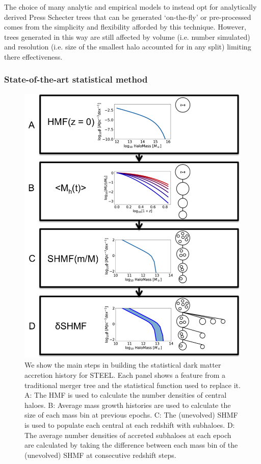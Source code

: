 The choice of many analytic and empirical models to instead opt for analytically derived Press Schecter trees that can be generated `on-the-fly' or pre-processed comes from the simplicity and flexibility afforded by this technique. However, trees generated in this way are still affected by volume (i.e. number simulated) and resolution (i.e. size of the smallest halo accounted for in any split) limiting there effectiveness.

\subsubsection{State-of-the-art statistical method}
\begin{figure}[h!]
    \centering
    \includegraphics[width = \linewidth]{Figures/Chapter2/StatDM.png}
    \caption{We show the main steps in building the statistical dark matter accretion history for STEEL. Each panel shows a feature from a traditional merger tree and the statistical function used to replace it. A: The HMF is used to calculate the number densities of central haloes. B: Average mass growth histories are used to calculate the size of each mass bin at previous epochs. C: The (unevolved) SHMF is used to populate each central at each redshift with subhaloes. D: The average number densities of accreted subhaloes at each epoch are calculated by taking the difference between each mass bin of the (unevolved) SHMF at consecutive redshift steps.}
    \label{fig:StatDM}
\end{figure}

